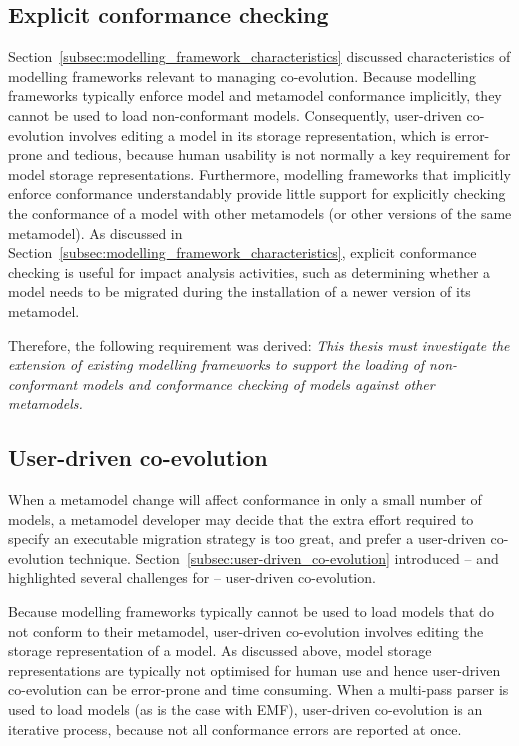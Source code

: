 \subsection{Explicit conformance checking}
Section~\ref{subsec:modelling_framework_characteristics} discussed characteristics of modelling frameworks relevant to managing co-evolution. Because modelling frameworks typically enforce model and metamodel conformance implicitly, they cannot be used to load non-conformant models. Consequently, user-driven co-evolution involves editing a model in its storage representation, which is error-prone and tedious, because human usability is not normally a key requirement for model storage representations. Furthermore, modelling frameworks that implicitly enforce conformance understandably provide little support for explicitly checking the conformance of a model with other metamodels (or other versions of the same metamodel). As discussed in Section~\ref{subsec:modelling_framework_characteristics}, explicit conformance checking is useful for impact analysis activities, such as determining whether a model needs to be migrated during the installation of a newer version of its metamodel.

Therefore, the following requirement was derived: \emph{This thesis must investigate the extension of existing modelling frameworks to support the loading of non-conformant models and conformance checking of models against other metamodels.}




\subsection{User-driven co-evolution}
When a metamodel change will affect conformance in only a small number of models, a metamodel developer may decide that the extra effort required to specify an executable migration strategy is too great, and prefer a user-driven co-evolution technique. Section~\ref{subsec:user-driven_co-evolution} introduced -- and highlighted several challenges for -- user-driven co-evolution.

Because modelling frameworks typically cannot be used to load models that do not conform to their metamodel, user-driven co-evolution involves editing the storage representation of a model. As discussed above, model storage representations are typically not optimised for human use and hence user-driven co-evolution can be error-prone and time consuming. When a multi-pass parser is used to load models (as is the case with EMF), user-driven co-evolution is an iterative process, because not all conformance errors are reported at once.

